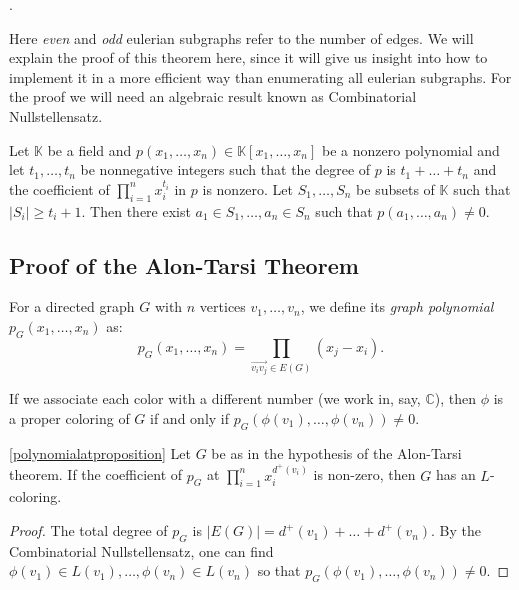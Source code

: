 .

Here \emph{even} and \emph{odd} eulerian subgraphs refer to the number of edges. We will explain the proof of this theorem here,
since it will give us insight into how to implement it in a more efficient way than enumerating all eulerian subgraphs. For the
proof we will need an algebraic result known as Combinatorial Nullstellensatz.

\begin{theorem}
Let $\mathbb{K}$ be a field and $p(x_1, \ldots, x_n) \in \mathbb{K}[x_1, \ldots, x_n]$ be a nonzero polynomial and let $t_1, \ldots, t_n$ be nonnegative integers such that the
 degree of $p$ is $t_1 + \ldots + t_n$ and the coefficient of $\prod_{i=1}^n x_i^{t_i}$ in $p$ is nonzero. 
 Let $S_1, \ldots, S_n$ be subsets of $\mathbb{K}$ such that $|S_i| \geq t_i+1$. Then there exist $a_1 \in S_1, \ldots, a_n \in S_n$ such that
$p(a_1, \ldots, a_n) \neq 0$.
\end{theorem}

\subsection{Proof of the Alon-Tarsi Theorem}

\begin{definition}
For a directed graph $G$ with $n$ vertices $v_1, \ldots, v_n$, we define its \emph{graph polynomial} $p_G(x_1, \ldots, x_n)$ as:
\[
p_G(x_1, \ldots, x_n) = \prod_{\overrightarrow{v_iv_j}\in E(G)} (x_j-x_i).
\]
\end{definition}


\begin{observation}
If we associate each color with a different number (we work in, say, $\mathbb{C}$), then $\phi$ is a proper coloring of 
$G$ if and only if $p_G(\phi(v_1), \ldots, \phi(v_n)) \neq 0$. 
\end{observation}

\begin{proposition}
\ref{polynomialatproposition}
Let $G$ be as in the hypothesis of the Alon-Tarsi theorem.
If the coefficient of $p_G$ at $\prod_{i=1}^n x_i^{d^+(v_i)}$ is non-zero, then $G$ has an $L$-coloring.
\end{proposition}
\begin{proof}
The total degree of $p_G$ is $|E(G)| = d^+(v_1) + \ldots + d^+(v_n)$. By the Combinatorial Nullstellensatz, 
one can find $\phi(v_1) \in L(v_1), \ldots, \phi(v_n) \in L(v_n)$ so that $p_G(\phi(v_1), \ldots, \phi(v_n)) \neq 0$.
\end{proof}

